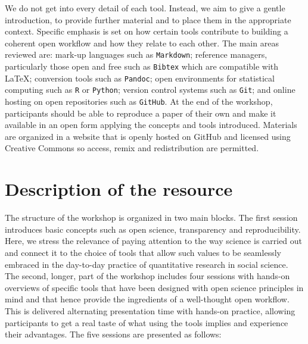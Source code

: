 \documentclass[11pt, a4paper]{article}
\begin{document}
We do not get into every detail of each tool. Instead, we aim to give a gentle
introduction, to provide further material and to place them in the appropriate
context. Specific emphasis is set on how certain tools contribute to
building a coherent open workflow and how they relate to each other. The main
areas reviewed are: mark-up languages such as \texttt{Markdown};
reference managers, particularly those open and free such as \texttt{Bibtex}
which are compatible with \LaTeX; conversion tools such as \texttt{Pandoc};
open environments for statistical computing such as \texttt{R} or
\texttt{Python}; version control systems such as \texttt{Git}; and online
hosting on open repositories such as \texttt{GitHub}. At the end of the
workshop, participants should be able to reproduce a paper of their own and
make it available in an open form applying the concepts and tools introduced.
Materials are organized in a website that is openly hosted on GitHub and
licensed using Creative Commons so access, remix and redistribution are
permitted.

\section{Description of the resource}
\label{sec-2}

The structure of the workshop is organized in two main blocks. The first
session introduces basic concepts such as open science, transparency and
reproducibility. Here, we stress the relevance of paying attention to the way
science is carried out and connect it to the choice of tools that allow such
values to be seamlessly embraced in the day-to-day practice of quantitative
research in social science. The second, longer, part of the workshop includes
four sessions with hands-on overviews of specific tools that have been
designed with open science principles in mind and that hence provide the
ingredients of a well-thought open workflow. This is delivered alternating
presentation time with hands-on practice, allowing participants to get a real taste of
what using the tools implies and experience their advantages. 
%
The five sessions are presented as follows:
\end{document}
